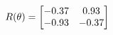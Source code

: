 \documentclass[preview]{standalone}
\begin{document}
\begin{align*}
\special{dvisvgm:raw <g id='unique000'>}R(\theta) = \begin{bmatrix}-0.37 & 0.93\\-0.93 & -0.37\end{bmatrix}\special{dvisvgm:raw </g>}
\end{align*}
\end{document}
